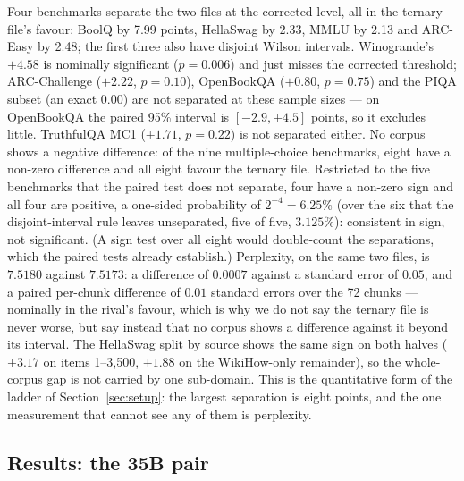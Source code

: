 \documentclass[10pt]{article} %
\begin{document}
Four benchmarks separate the two files at the corrected level, all in
the ternary file's favour: BoolQ by 7.99 points, HellaSwag by 2.33, MMLU
by 2.13 and ARC-Easy by 2.48; the first three also have disjoint Wilson
intervals. Winogrande's $+4.58$ is nominally significant ($p = 0.006$) and
just misses the corrected threshold; ARC-Challenge ($+2.22$, $p = 0.10$),
OpenBookQA ($+0.80$, $p = 0.75$) and the PIQA subset (an exact $0.00$) are not
separated at these sample sizes --- on OpenBookQA the paired 95\% interval is
$[-2.9, +4.5]$ points, so it excludes little. TruthfulQA MC1 ($+1.71$,
$p = 0.22$) is not separated either. No corpus shows a negative
difference: of the nine multiple-choice benchmarks, eight have a non-zero
difference and all eight favour the ternary file. Restricted to the five
benchmarks that the paired test does not separate, four have a non-zero sign
and all four are positive, a one-sided probability of $2^{-4} = 6.25\%$
(over the six that the disjoint-interval rule leaves unseparated, five of
five, $3.125\%$): consistent in sign, not significant. (A sign test over all
eight would double-count the separations, which the paired tests already
establish.)
Perplexity, on the same two
files, is $7.5180$ against $7.5173$: a difference of $0.0007$ against a
standard error of $0.05$, and a paired per-chunk difference of $0.01$ standard
errors over the 72 chunks --- nominally in the rival's favour, which is why we
do not say the ternary file is never worse, but say instead that no corpus
shows a difference against it beyond its interval. The HellaSwag split by
source shows the same sign on
both halves ($+3.17$ on items 1--3,500, $+1.88$ on the WikiHow-only remainder),
so the whole-corpus gap is not carried by one sub-domain. This is the
quantitative form of the ladder of Section~\ref{sec:setup}: the largest
separation is eight points, and the one measurement that cannot see any of
them is perplexity.

\subsection{Results: the 35B pair}
\label{sec:bench35}
\end{document}
